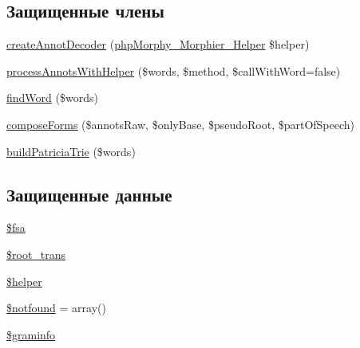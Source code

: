 \subsection*{Защищенные члены}
\begin{DoxyCompactItemize}
\item 
\hyperlink{classphpMorphy__Morphier__Bulk_a5068e2ea62a6f852d80ab01e40f868ce}{createAnnotDecoder} (\hyperlink{classphpMorphy__Morphier__Helper}{phpMorphy\_\-Morphier\_\-Helper} \$helper)
\item 
\hyperlink{classphpMorphy__Morphier__Bulk_a8685e2171ad20f03273276b576abf8fa}{processAnnotsWithHelper} (\$words, \$method, \$callWithWord=false)
\item 
\hyperlink{classphpMorphy__Morphier__Bulk_aca4a1b45ce6c56fab81d891b6179ac50}{findWord} (\$words)
\item 
\hyperlink{classphpMorphy__Morphier__Bulk_af047aa2eb04d9b214bb8998464eaa941}{composeForms} (\$annotsRaw, \$onlyBase, \$pseudoRoot, \$partOfSpeech)
\item 
\hyperlink{classphpMorphy__Morphier__Bulk_aaaf85770523fe111fc8bb787ee81cebe}{buildPatriciaTrie} (\$words)
\end{DoxyCompactItemize}
\subsection*{Защищенные данные}
\begin{DoxyCompactItemize}
\item 
\hyperlink{classphpMorphy__Morphier__Bulk_a63827a8bfa5f1b3ce8f36c3d79fc27dd}{\$fsa}
\item 
\hyperlink{classphpMorphy__Morphier__Bulk_a242191674ec07debf33e8837f45d874a}{\$root\_\-trans}
\item 
\hyperlink{classphpMorphy__Morphier__Bulk_a7d58fc822026887041dd71ff843303a5}{\$helper}
\item 
\hyperlink{classphpMorphy__Morphier__Bulk_a0f5fce3501ff0a2743d796240813fe27}{\$notfound} = array()
\item 
\hyperlink{classphpMorphy__Morphier__Bulk_ae9b60e58b7b560e30e384ca26a5ad0b1}{\$graminfo}
\end{DoxyCompactItemize}


